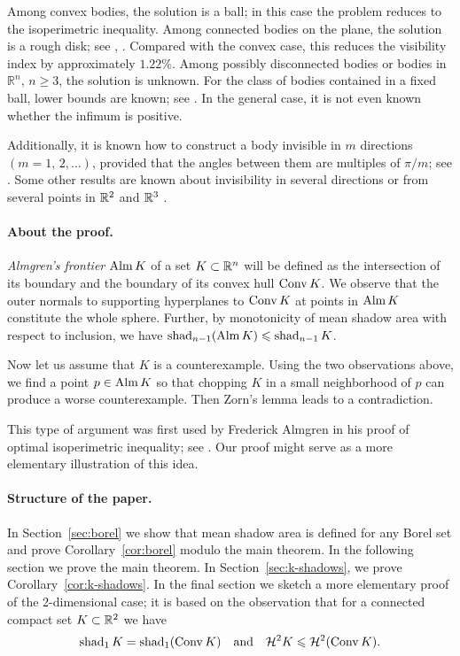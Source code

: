 \documentclass[a4paper,10pt]{article}
\begin{document}
Among convex bodies, the solution is a ball; in this case the problem reduces to the isoperimetric inequality.
Among connected bodies on the plane, the solution is a rough disk; see \cite{ARMA}, \cite[Theorem 6.1]{book2012}.
Compared with the convex case, this reduces the visibility index by approximately $1.22\%$.
Among possibly disconnected bodies or bodies in $\mathbb R^n,\, n \ge 3$, the solution is unknown.
For the class of bodies contained in a fixed ball, lower bounds are known; see \cite{cam1,cam2}.
In the general case, it is not even known whether the infimum is positive.

Additionally, it is known how to construct a body invisible in $m$ directions $(m=1,\,2,\ldots)$, provided that the angles between them are multiples of $\pi/m$; see \cite{invisNpoints}.
Some other results are known about invisibility in several directions or from several points in $\mathbb{R}^2$ and $\mathbb{R}^3$ \cite{book2012,fractal,invis2points}.

\paragraph{About the proof.}
\emph{Almgren's frontier} $\mathop{\rm Alm} K$ of a set $K\subset \mathbb{R}^n$ will be defined
as the intersection of its boundary and the boundary of its convex hull $\mathop{\rm Conv} K$.
We observe that the outer normals to supporting hyperplanes to $\mathop{\rm Conv} K$ at points in $\mathop{\rm Alm} K$ constitute the whole sphere.
Further, by monotonicity of mean shadow area with respect to inclusion, we have $\fav_{n-1}(\cont K)\z\le \fav_{n-1}K$.

Now let us assume that $K$ is a counterexample.
Using the two observations above, we find a point $p\in \mathop{\rm Alm} K$ so that chopping $K$ in a small neighborhood of $p$ can produce a worse counterexample.
Then Zorn's lemma leads to a contradiction.

This type of argument was first used by Frederick Almgren in his proof of optimal isoperimetric inequality; see \cite{almgren-1986}.
Our proof might serve as a more elementary illustration of this idea.

\paragraph{Structure of the paper.}
In Section~\ref{sec:borel} we show that mean shadow area is defined for any Borel set and prove Corollary~\ref{cor:borel} modulo the main theorem.
In the following section we prove the main theorem.
In Section~\ref{sec:k-shadows}, we prove Corollary~\ref{cor:k-shadows}.
In the final section we sketch a more elementary proof of the 2-dimensional case;
it is based on the observation that for a connected compact set $K\subset\mathbb{R}^2$ we have
\[\mathop{\rm shad}\nolimits_1K=\mathop{\rm shad}\nolimits_1(\mathop{\rm Conv} K)
\quad\text{and}\quad
\mathcal H^2 K\leqslant \mathcal H^2(\mathop{\rm Conv} K).
\]
\end{document}

